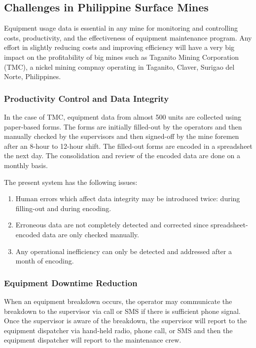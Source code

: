 \documentclass{article}
\begin{document}
\subsection{Challenges in Philippine Surface Mines}

Equipment usage data is essential in any mine for monitoring and controlling costs, productivity, and the effectiveness of equipment maintenance program.
Any effort in slightly reducing costs and improving efficiency will have a very big impact on the profitability of big mines such as Taganito Mining Corporation (TMC), a nickel mining compnay operating in Taganito, Claver, Surigao del Norte, Philippines.

\subsubsection{Productivity Control and Data Integrity}

In the case of TMC, equipment data from almost 500 units are collected using paper-based forms.
The forms are initially filled-out by the operators and then manually checked by the supervisors and then signed-off by the mine foremen after an 8-hour to 12-hour shift.
The filled-out forms are encoded in a spreadsheet the next day.
The consolidation and review of the encoded data are done on a monthly basis.

The present system has the following issues:

\begin{enumerate}
    \item Human errors which affect data integrity may be introduced twice: during filling-out and during encoding.
    \item Erroneous data are not completely detected and corrected since spreadsheet-encoded data are only checked manually.
    \item Any operational inefficiency can only be detected and addressed after a month of encoding.
\end{enumerate}

\subsubsection{Equipment Downtime Reduction}

When an equipment breakdown occurs, the operator may communicate the breakdown to the supervisor via call or SMS if there is sufficient phone signal.
Once the supervisor is aware of the breakdown, the supervisor will report to the equipment dispatcher via hand-held radio, phone call, or SMS and then the equipment dispatcher will report to the maintenance crew.
\end{document}
